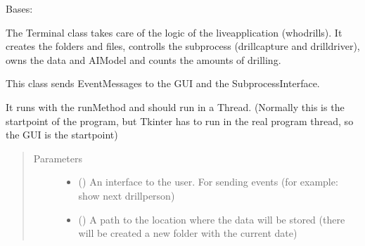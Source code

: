 \documentclass[letterpaper,10pt,english]{sphinxmanual}
\begin{document}
\begin{fulllineitems}
\label{\detokenize{anoog.automation:anoog.automation.controller.Terminal}}
\sphinxAtStartPar
Bases: {\hyperref[\detokenize{anoog.automation:anoog.automation.event.Eventsystem_Component}]{}}

\sphinxAtStartPar
The Terminal class takes care of the logic of the live\sphinxhyphen{}application (who\sphinxhyphen{}drills).
It creates the folders and files, controlls the subprocess (drillcapture and drilldriver),
owns the data and AI\sphinxhyphen{}Model and counts the amounts of drilling.

\sphinxAtStartPar
This class sends Event\sphinxhyphen{}Messages to the GUI and the SubprocessInterface.

\sphinxAtStartPar
It runs with the run\sphinxhyphen{}Method and should run in a Thread.
(Normally this is the startpoint of the program, but Tkinter has to run in the real program thread, so the GUI is the startpoint)
\begin{quote}\begin{description}
\item[{Parameters}] \leavevmode\begin{itemize}
\item {} 
\sphinxAtStartPar
{} ({\hyperref[\detokenize{anoog.automation:anoog.automation.graphical_user_interface.GUI_App}]{}}) \textendash{} An interface to the user. For sending events (for example: show next drill\sphinxhyphen{}person)

\item {} 
\sphinxAtStartPar
{} (\sphinxstyleliteralemphasis{\sphinxupquote{, }}) \textendash{} A path to the location where the data will be stored (there will be created a new folder with the current date)


\end{itemize}
\end{description}
\end{quote}
\end{fulllineitems}
\end{document}
